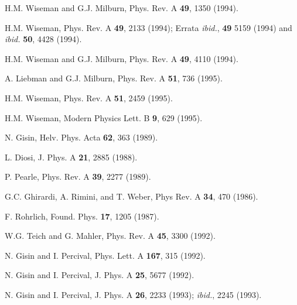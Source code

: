 \begin{thebibliography}{99}
H.M. Wiseman and G.J. Milburn,
Phys. Rev. A {\bf 49}, 1350 (1994).

H.M. Wiseman,
Phys. Rev. A {\bf 49}, 2133 (1994);
Errata {\em ibid.}, {\bf 49} 5159 (1994) and {\em ibid.} {\bf 50}, 4428 (1994).

H.M. Wiseman and G.J. Milburn,
Phys. Rev. A {\bf 49}, 4110 (1994).

A. Liebman and G.J. Milburn,
Phys. Rev. A {\bf 51}, 736 (1995).

H.M. Wiseman,
Phys. Rev. A {\bf 51}, 2459 (1995).

H.M. Wiseman,
Modern Physics Lett. B {\bf 9}, 629 (1995).

N. Gisin, %
Helv. Phys. Acta {\bf 62}, 363 (1989).

L. Diosi, 
J. Phys. A {\bf 21}, 2885 (1988).

P. Pearle,
Phys. Rev. A {\bf 39}, 2277 (1989).

G.C. Ghirardi, A. Rimini, and T. Weber, 
Phys Rev. A {\bf 34}, 470 (1986).

F. Rohrlich,
Found. Phys. {\bf 17}, 1205 (1987).

W.G. Teich and G. Mahler,
Phys. Rev. A {\bf 45}, 3300 (1992).

N. Gisin and I. Percival,
Phys. Lett. A {\bf 167}, 315 (1992).

N. Gisin and I. Percival,
J. Phys. A {\bf 25}, 5677 (1992).

N. Gisin and I. Percival,
J. Phys. A {\bf 26}, 2233 (1993); 
{\em ibid.}, 2245 (1993).


\end{thebibliography}
